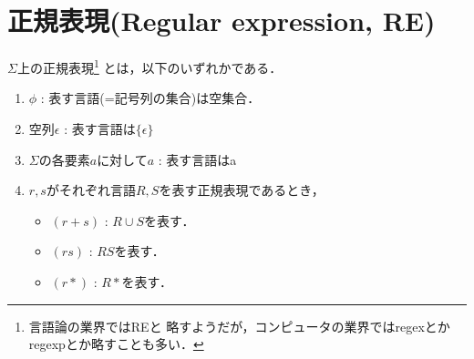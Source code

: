 \section{正規表現(Regular expression, RE)}
$\Sigma$上の正規表現\footnote{言語論の業界ではREと
 略すようだが，コンピュータの業界ではregexとかregexpとか略すことも多い．}
 とは，以下のいずれかである．
\begin{enumerate}
 \item $\phi$ : 表す言語(=記号列の集合)は空集合．
 \item 空列$\epsilon$ : 表す言語は$\{\epsilon\}$
 \item $\Sigma$の各要素$a$に対して$a$ : 表す言語は{a}
 \item $r, s$がそれぞれ言語$R, S$を表す正規表現であるとき，
       \begin{itemize}
        \item $(r+s)$ : $R\cup S$を表す．
        \item $(rs)$ : $RS$を表す．
        \item $(r*)$ : $R*$を表す．
       \end{itemize}
\end{enumerate}
